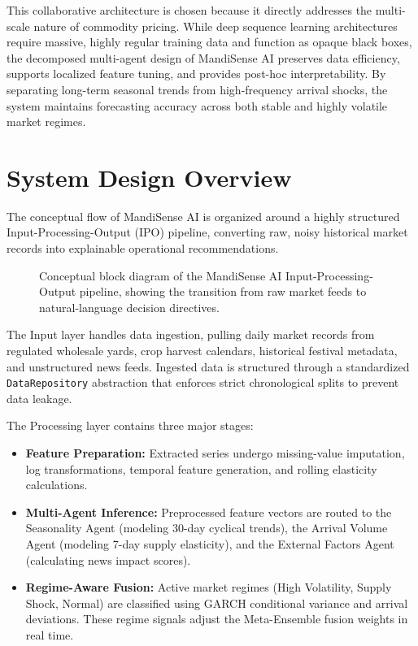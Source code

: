 \documentclass[12pt,a4paper]{report}
\theoremstyle{definition}
\theoremstyle{remark}
\begin{document}
This collaborative architecture is chosen because it directly addresses the multi-scale nature of commodity pricing. While deep sequence learning architectures require massive, highly regular training data and function as opaque black boxes, the decomposed multi-agent design of MandiSense AI preserves data efficiency, supports localized feature tuning, and provides post-hoc interpretability. By separating long-term seasonal trends from high-frequency arrival shocks, the system maintains forecasting accuracy across both stable and highly volatile market regimes.

\section{System Design Overview}

The conceptual flow of MandiSense AI is organized around a highly structured Input-Processing-Output (IPO) pipeline, converting raw, noisy historical market records into explainable operational recommendations.

\begin{figure}[htbp]
    \centering
    \caption{Conceptual block diagram of the MandiSense AI Input-Processing-Output pipeline, showing the transition from raw market feeds to natural-language decision directives.}
    \label{fig:ipo_diagram}
\end{figure}

The Input layer handles data ingestion, pulling daily market records from regulated wholesale yards, crop harvest calendars, historical festival metadata, and unstructured news feeds. Ingested data is structured through a standardized \texttt{DataRepository} abstraction that enforces strict chronological splits to prevent data leakage.

The Processing layer contains three major stages:
\begin{itemize}
    \item \textbf{Feature Preparation:} Extracted series undergo missing-value imputation, log transformations, temporal feature generation, and rolling elasticity calculations.
    \item \textbf{Multi-Agent Inference:} Preprocessed feature vectors are routed to the Seasonality Agent (modeling 30-day cyclical trends), the Arrival Volume Agent (modeling 7-day supply elasticity), and the External Factors Agent (calculating news impact scores).
    \item \textbf{Regime-Aware Fusion:} Active market regimes (High Volatility, Supply Shock, Normal) are classified using GARCH conditional variance and arrival deviations. These regime signals adjust the Meta-Ensemble fusion weights in real time.
\end{itemize}
\end{document}
